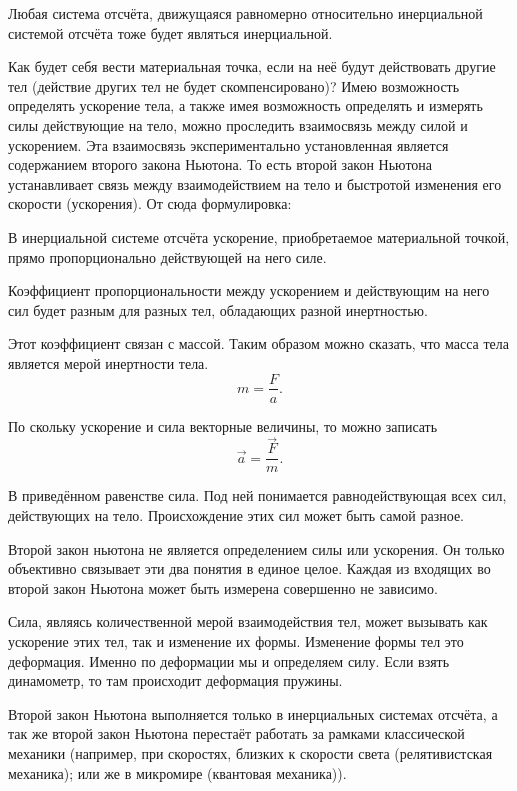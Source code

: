 Любая система отсчёта, движущаяся равномерно относительно инерциальной системой
отсчёта тоже будет являться инерциальной.

Как будет себя вести материальная точка, если на неё будут действовать другие
тел (действие других тел не будет скомпенсировано)? Имею возможность определять
ускорение тела, а также имея возможность определять и измерять силы действующие
на тело, можно проследить взаимосвязь между силой и ускорением. Эта взаимосвязь
экспериментально установленная является содержанием второго закона Ньютона. То
есть второй закон Ньютона устанавливает связь между взаимодействием на тело и
быстротой изменения его скорости (ускорения). От сюда формулировка:

\begin{theorem}\label{thrm:second-nuton}
  В инерциальной системе отсчёта ускорение, приобретаемое материальной точкой,
  прямо пропорционально действующей на него силе.
\end{theorem}

Коэффициент пропорциональности между ускорением и действующим на него сил будет
разным для разных тел, обладающих разной инертностью.

Этот коэффициент связан с массой. Таким образом можно сказать, что масса тела
является мерой инертности тела. \[
  m = \frac{F}{a}
.\]

По скольку ускорение и сила векторные величины, то можно записать \[
  \vec{a} = \frac{\vec{F}}{m}
.\]

В приведённом равенстве сила. Под ней понимается равнодействующая всех сил,
действующих на тело. Происхождение этих сил может быть самой разное.

\begin{corollary}
  Второй закон ньютона не является определением силы или ускорения. Он только
  объективно связывает эти два понятия в единое целое. Каждая из входящих во
  второй закон Ньютона может быть измерена совершенно не зависимо.
\end{corollary}

Сила, являясь количественной мерой взаимодействия тел, может вызывать как
ускорение этих тел, так и изменение их формы. Изменение формы тел это
деформация.
Именно по деформации мы и определяем силу. Если взять динамометр, то там
происходит деформация пружины.

\begin{corollary}
  Второй закон Ньютона выполняется только в инерциальных системах отсчёта, а так
  же второй закон Ньютона перестаёт работать за рамками классической механики
  (например, при скоростях, близких к скорости света (релятивистская механика);
  или же в микромире (квантовая механика)).
\end{corollary}

